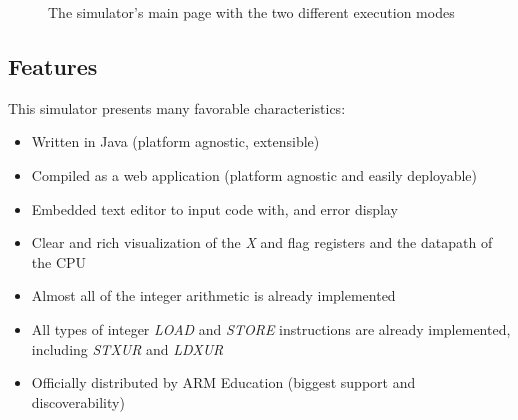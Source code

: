 \begin{figure}[H]
	\centering
	
	\caption{The simulator's main page with the two different execution modes}
\end{figure}

\subsection*{Features}

This simulator presents many favorable characteristics:

\begin{itemize}[label=\textendash]
	\item Written in Java (platform agnostic, extensible)
	\item Compiled as a web application (platform agnostic and easily deployable)
	\item Embedded text editor to input code with, and error display
	\item Clear and rich visualization of the \emph{X} and flag registers and the datapath of the CPU
	\item Almost all of the integer arithmetic is already implemented
	\item All types of integer \emph{LOAD} and \emph{STORE} instructions are already implemented, including \emph{STXUR} and \emph{LDXUR}
	\item Officially distributed by ARM Education (biggest support and discoverability)
\end{itemize}


